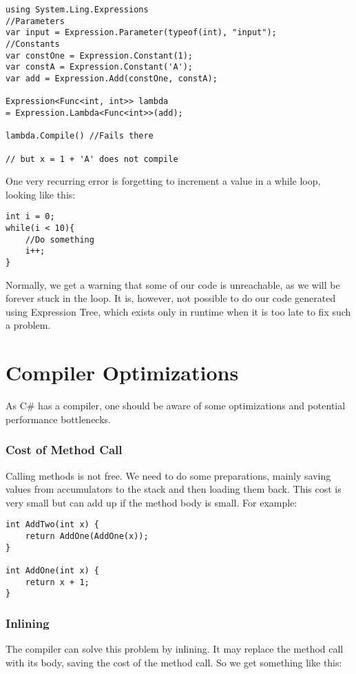 \begin{lstlisting}
using System.Ling.Expressions
//Parameters
var input = Expression.Parameter(typeof(int), "input");
//Constants
var constOne = Expression.Constant(1);
var constA = Expression.Constant('A');
var add = Expression.Add(constOne, constA);

Expression<Func<int, int>> lambda 
= Expression.Lambda<Func<int>>(add);

lambda.Compile() //Fails there 

// but x = 1 + 'A' does not compile
\end{lstlisting}

One very recurring error is forgetting to increment a value in a while loop, looking like this:
\begin{lstlisting}
int i = 0;
while(i < 10){
    //Do something
    i++;
}
\end{lstlisting}
Normally, we get a warning that some of our code is unreachable, as we will be forever stuck in the loop. It is, however, not possible to do our code generated using Expression Tree, which exists only in runtime when it is too late to fix such a problem. 



\section{Compiler Optimizations}

As C\# has a compiler, one should be aware of some optimizations and potential performance bottlenecks.

\subsubsection{Cost of Method Call}
Calling methods is not free. We need to do some preparations, mainly saving values from accumulators to the stack and then loading them back. This cost is very small but can add up if the method body is small. For example:

\begin{lstlisting}
int AddTwo(int x) {
    return AddOne(AddOne(x));
}

int AddOne(int x) {
    return x + 1;
}
\end{lstlisting}

\subsubsection{Inlining}
The compiler can solve this problem by inlining. It may replace the method call with its body, saving the cost of the method call. So we get something like this:

